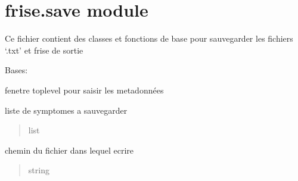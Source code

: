 \documentclass[letterpaper,10pt,english]{sphinxmanual}
\begin{document}
\section{frise.save module}
\label{\detokenize{frise:module-frise.save}}\label{\detokenize{frise:frise-save-module}}
\sphinxAtStartPar
Ce fichier contient des classes et fonctions de base pour sauvegarder les fichiers ‘.txt’ et frise de sortie

\begin{fulllineitems}
\label{\detokenize{frise:frise.save.MetaData_WD}}
\pysigstartsignatures
{}
\pysigstopsignatures
\sphinxAtStartPar
Bases: 

\sphinxAtStartPar
fenetre toplevel pour saisir les metadonnées

\begin{fulllineitems}
\label{\detokenize{frise:frise.save.MetaData_WD.liste}}
\pysigstartsignatures
{}
\pysigstopsignatures
\sphinxAtStartPar
liste de symptomes a sauvegarder
\begin{quote}\begin{description}
\sphinxAtStartPar
list

\end{description}\end{quote}

\end{fulllineitems}


\begin{fulllineitems}
\label{\detokenize{frise:frise.save.MetaData_WD.filename}}
\pysigstartsignatures
{}
\pysigstopsignatures
\sphinxAtStartPar
chemin du fichier dans lequel ecrire
\begin{quote}\begin{description}
\sphinxAtStartPar
string


\end{description}
\end{quote}
\end{fulllineitems}
\end{fulllineitems}
\end{document}
